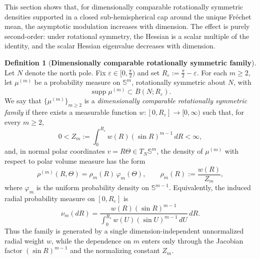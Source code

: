 \documentclass{amsart}
\theoremstyle{definition}
\newtheorem{definition}[theorem]{Definition}
\theoremstyle{remark}
\newcommand\0{\boldsymbol{0}}
\begin{document}
This section shows that, for dimensionally comparable rotationally symmetric densities supported in a closed sub-hemispherical cap around the unique Fr\'echet mean, the asymptotic modulation increases with dimension.  The effect is purely second-order: under rotational symmetry, the Hessian is a scalar multiple of the identity, and the scalar Hessian eigenvalue decreases with dimension.

\begin{definition}[\textbf{Dimensionally comparable rotationally symmetric family}]
\label{def:dimensionally-comparable-distributions}
Let \(N\) denote the north pole.  Fix \(\varepsilon\in[0,\frac{\pi}{2})\) and set \(R_\varepsilon:=\frac{\pi}{2}-\varepsilon\).  For each \(m\ge2\), let \(\mu^{(m)}\) be a probability measure on \(\mathbb S^m\), rotationally symmetric about \(N\), with
\[
\operatorname{supp}\mu^{(m)}\subset \overline B(N;R_\varepsilon).
\]
We say that \(\{\mu^{(m)}\}_{m\ge2}\) is a \emph{dimensionally comparable rotationally symmetric family} if there exists a measurable function \(w:[0,R_\varepsilon]\to[0,\infty)\) such that, for every \(m\ge2\),
\[
0<Z_m:=\int_{0}^{R_\varepsilon} w(R)(\sin R)^{m-1}\,dR<\infty,
\]
and, in normal polar coordinates \(v=R\Theta\in T_N\mathbb S^m\), the density of \(\mu^{(m)}\) with respect to polar volume measure has the form
\[
\rho^{(m)}(R,\Theta)=\rho_m(R)\,\varphi_m(\Theta),
\qquad
\rho_m(R):=\frac{w(R)}{Z_m},
\]
where \(\varphi_m\) is the uniform probability density on \(\mathbb S^{m-1}\).  Equivalently, the induced radial probability measure on \([0,R_\varepsilon]\) is
\[
\nu_m(dR)=\frac{w(R)(\sin R)^{m-1}}{\int_{0}^{R_\varepsilon} w(U)(\sin U)^{m-1}\,dU}\,dR.
\]
Thus the family is generated by a single dimension-independent unnormalized radial weight \(w\), while the dependence on \(m\) enters only through the Jacobian factor \((\sin R)^{m-1}\) and the normalizing constant \(Z_m\).
\end{definition}
\end{document}
